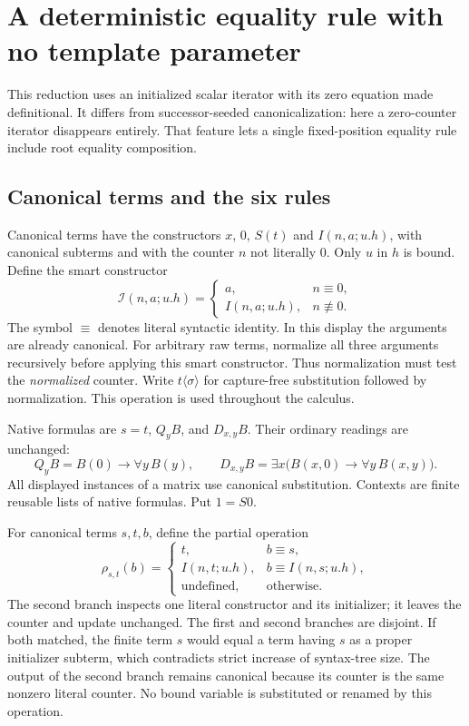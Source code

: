 \documentclass[11pt,a4paper]{article}
\theoremstyle{definition}
\begin{document}

\section{A deterministic equality rule with no template parameter}
\label{seed:main}

This reduction uses an initialized scalar iterator with its zero equation
made definitional. It differs from successor-seeded canonicalization:
here a zero-counter iterator disappears entirely. That feature lets a
single fixed-position equality rule include root equality composition.

\subsection{Canonical terms and the six rules}

Canonical terms have the constructors $x$, $0$, $S(t)$ and
$I(n,a;u.h)$, with canonical subterms and with the counter $n$ not
literally $0$. Only $u$ in $h$ is bound. Define the smart constructor
\[
 \mathcal I(n,a;u.h)=
 \begin{cases}
 a,&n\equiv0,\\
 I(n,a;u.h),&n\not\equiv0.
 \end{cases}
\]
The symbol $\equiv$ denotes literal syntactic identity. In this display
the arguments are already canonical. For arbitrary raw terms, normalize
all three arguments recursively before applying this smart constructor.
Thus normalization must test the \emph{normalized} counter.
Write $t\langle\sigma\rangle$ for capture-free substitution followed by
normalization. This operation is used throughout the calculus.

Native formulas are $s=t$, $Q_y B$, and $D_{x,y}B$. Their ordinary
readings are unchanged:
\[
 Q_yB=B(0)\to\forall y\,B(y),\qquad
 D_{x,y}B=\exists x\bigl(B(x,0)\to\forall y\,B(x,y)\bigr).
\]
All displayed instances of a matrix use canonical substitution.
Contexts are finite reusable lists of native formulas. Put $1=S0$.

For canonical terms $s,t,b$, define the partial operation
\[
 \rho_{s,t}(b)=
 \begin{cases}
 t,&b\equiv s,\\
 I(n,t;u.h),&b\equiv I(n,s;u.h),\\
 \text{undefined},&\text{otherwise}.
 \end{cases}
 \tag{Seed replacement}\label{seed:rho}
\]
The second branch inspects one literal constructor and its initializer;
it leaves the counter and update unchanged. The first and second branches
are disjoint. If both matched, the finite term $s$ would equal a term
having $s$ as a proper initializer subterm, which contradicts strict
increase of syntax-tree size. The output of the second branch remains
canonical because its counter is the same nonzero literal counter.
No bound variable is substituted or renamed by this operation.
\end{document}
